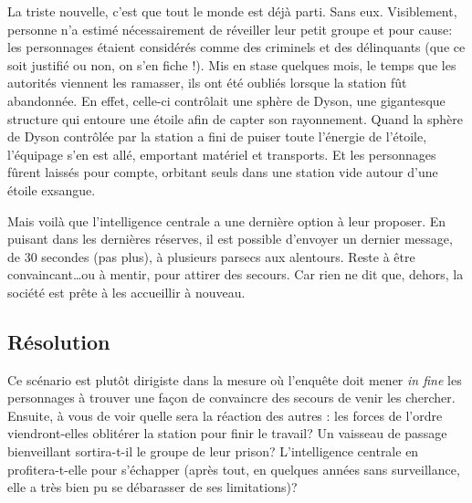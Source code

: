 La triste nouvelle, c'est que tout le monde est déjà parti. Sans eux.
Visiblement, personne n'a estimé nécessairement de réveiller leur petit groupe et pour cause: les personnages étaient considérés comme des criminels et des délinquants (que ce soit justifié ou non, on s'en fiche !).
Mis en stase quelques mois, le temps que les autorités viennent les ramasser, ils ont été \og oubliés \fg lorsque la station fût abandonnée.
En effet, celle-ci contrôlait une sphère de Dyson, une gigantesque structure qui entoure une étoile afin de capter son rayonnement.
Quand la sphère de Dyson contrôlée par la station a fini de puiser toute l'énergie de l'étoile, l'équipage s'en est allé, emportant matériel et transports.
Et les personnages fûrent laissés pour compte, orbitant seuls dans une station vide autour d'une étoile exsangue.

Mais voilà que l'intelligence centrale a une dernière option à leur proposer.
En puisant dans les dernières réserves, il est possible d'envoyer un dernier message, de 30 secondes (pas plus), à plusieurs parsecs aux alentours.
Reste à être convaincant\dots ou à mentir, pour attirer des secours.
Car rien ne dit que, dehors, la société est prête à les accueillir à nouveau.

\subsection{Résolution}

Ce scénario est plutôt dirigiste dans la mesure où l'enquête doit mener \emph{in fine} les personnages à trouver une façon de convaincre des secours de venir les chercher.
Ensuite, à vous de voir quelle sera la réaction des \og autres \og: les forces de l'ordre viendront-elles oblitérer la station pour finir le travail? Un vaisseau de passage bienveillant sortira-t-il le groupe de leur prison? L'intelligence centrale en profitera-t-elle pour s'échapper (après tout, en quelques années sans surveillance, elle a très bien pu se débarasser de ses limitations)?
